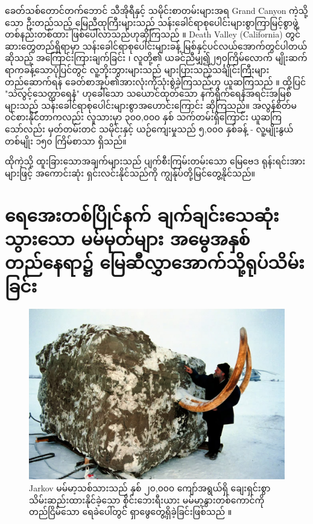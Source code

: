 \documentclass[10pt,twocolumn,letterpaper]{article}
\begin{document}
ခေတ်သစ်တောင်တက်ဘောင် သီအိုရီနှင့် သမိုင်းစာတမ်းများအရ Grand Canyon ကဲ့သို့သော ဦးတည်သည့် မြေညီထုကြီးများသည် သန်းခေါင်ရာစုပေါင်းများစွာကြာမြင့်စွာဖွဲ့တစ်နည်းတစ်ထား ဖြစ်ပေါ်လာသည်ဟုဆိုကြသည် \cite{143}။ Death Valley (California) တွင် ဆားတွေတည်ရှိရာမှာ သန်းခေါင်ရာစုပေါင်းများခန့် မြစ်နှင့်ပင်လယ်အောက်တွင်ပါတယ်ဆိုသည့် အကြောင်းကြားချက်ခြင်း \cite{144}၊ လူတို့၏ ယခင်ညီမျှ၍၂၅၀ကြိမ်လောက် မျိုးဆက်ရာကခန့်သောပုံပြင်တွင် လူ့ဘိုးဘွားများသည် များပြားသည့်သင်္ချိုင်းကြီးများ တည်ဆောက်ရန် ခေတ်စာအုပ်၏အားလုံးကိုသုံးစွဲခဲ့ကြသည်ဟု ယူဆကြသည် \cite{29,70}။ ထို့ပြင် "သဲလွင့်သေတ္တာရေနံ" ဟုခေါ်သော သယောင်ထုတ်သော နက်ရိုက်ရေနံအရင်းအမြစ်များသည် သန်းခေါင်ရာစုပေါင်းများစွာအဟောင်းကြောင်း \cite{104} ဆိုကြသည်။ အလွန်စိတ်မဝင်စားနိုင်တာကလည်း လူသားမှာ ၃၀၀,၀၀၀ နှစ် သက်တမ်းရှိကြောင်း ယူဆကြသော်လည်း မှတ်တမ်းတင် သမိုင်းနှင့် ယဉ်ကျေးမှုသည် ၅,၀၀၀ နှစ်ခန့် - လူ့မျိုးနွယ် တစ်မျိုး ၁၅၀ ကြိမ်စာသာ ရှိသည်။

ထိုကဲ့သို့ ထူးခြားသောအချက်များသည် ပျက်စီးကြမ်းတမ်းသော မြေဗေဒ ရုန်းရင်းအားများဖြင့် အကောင်းဆုံး ရှင်းလင်းနိုင်သည်ကို ကျွန်ုပ်တို့မြင်တွေ့နိုင်သည်။

\section{ရေအေးတစ်ပြိုင်နက် ချက်ချင်းသေဆုံးသွားသော မမ်မုတ်များ အမွေအနှစ်တည်နေရာ၌ မြေဆီလွှာအောက်သို့ရုပ်သိမ်းခြင်း}


\begin{figure}[t]
\begin{center}
   \includegraphics[width=1\linewidth]{jarkov-mammoth.jpg}
\end{center}
   \caption{Jarkov မမ်မာ့သစ်သားသည် နှစ် ၂၀,၀၀၀ ကျော်အရွယ်ရှိ ချေးရှင်းစွာသိမ်းဆည်းထားနိုင်ခဲ့သော စိုင်းဘေးရီးယား မမ်မာ့နွားတစ်ကောင်ကို တည်ငြိမ်သော ရေခဲပေါ်တွင် ရှာဖွေတွေ့ရှိခဲ့ခြင်းဖြစ်သည် \cite{51}။}
\label{fig:1}
\label{fig:onecol}
\end{figure}
\end{document}

